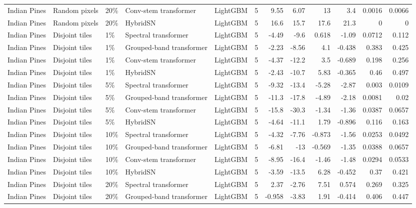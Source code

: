\begin{table}
\begin{tabular}{lllllrrrrrrr}
Indian Pines & Random pixels & 20\% & Conv-stem transformer & LightGBM & 5 & 9.55 & 6.07 & 13 & 3.4 & 0.0016 & 0.0066 \\
Indian Pines & Random pixels & 20\% & HybridSN & LightGBM & 5 & 16.6 & 15.7 & 17.6 & 21.3 & 0 & 0 \\
Indian Pines & Disjoint tiles & 1\% & Spectral transformer & LightGBM & 5 & -4.49 & -9.6 & 0.618 & -1.09 & 0.0712 & 0.112 \\
Indian Pines & Disjoint tiles & 1\% & Grouped-band transformer & LightGBM & 5 & -2.23 & -8.56 & 4.1 & -0.438 & 0.383 & 0.425 \\
Indian Pines & Disjoint tiles & 1\% & Conv-stem transformer & LightGBM & 5 & -4.37 & -12.2 & 3.5 & -0.689 & 0.198 & 0.256 \\
Indian Pines & Disjoint tiles & 1\% & HybridSN & LightGBM & 5 & -2.43 & -10.7 & 5.83 & -0.365 & 0.46 & 0.497 \\
Indian Pines & Disjoint tiles & 5\% & Spectral transformer & LightGBM & 5 & -9.32 & -13.4 & -5.28 & -2.87 & 0.003 & 0.0109 \\
Indian Pines & Disjoint tiles & 5\% & Grouped-band transformer & LightGBM & 5 & -11.3 & -17.8 & -4.89 & -2.18 & 0.0081 & 0.02 \\
Indian Pines & Disjoint tiles & 5\% & Conv-stem transformer & LightGBM & 5 & -15.8 & -30.3 & -1.34 & -1.36 & 0.0387 & 0.0657 \\
Indian Pines & Disjoint tiles & 5\% & HybridSN & LightGBM & 5 & -4.64 & -11.1 & 1.79 & -0.896 & 0.116 & 0.163 \\
Indian Pines & Disjoint tiles & 10\% & Spectral transformer & LightGBM & 5 & -4.32 & -7.76 & -0.873 & -1.56 & 0.0253 & 0.0492 \\
Indian Pines & Disjoint tiles & 10\% & Grouped-band transformer & LightGBM & 5 & -6.81 & -13 & -0.569 & -1.35 & 0.0388 & 0.0657 \\
Indian Pines & Disjoint tiles & 10\% & Conv-stem transformer & LightGBM & 5 & -8.95 & -16.4 & -1.46 & -1.48 & 0.0294 & 0.0533 \\
Indian Pines & Disjoint tiles & 10\% & HybridSN & LightGBM & 5 & -3.59 & -13.5 & 6.28 & -0.452 & 0.37 & 0.421 \\
Indian Pines & Disjoint tiles & 20\% & Spectral transformer & LightGBM & 5 & 2.37 & -2.76 & 7.51 & 0.574 & 0.269 & 0.325 \\
Indian Pines & Disjoint tiles & 20\% & Grouped-band transformer & LightGBM & 5 & -0.958 & -3.83 & 1.91 & -0.414 & 0.406 & 0.447 \\

\end{tabular}
\end{table}
